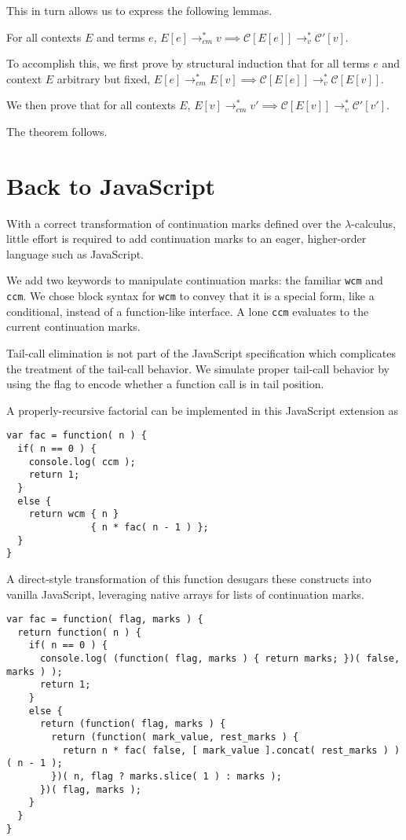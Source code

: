 \documentclass{llncs}
\newcommand{\lc}[0]{$\lambda$-calculus}
\newcommand{\lvrrs}[0]{\rightarrow_v^{*}}
\newcommand{\cmrrs}[0]{\rightarrow_{cm}^{*}}
\newcommand{\C}[1]{\mathcal{C}[#1]}
\newcommand{\Cp}[1]{\mathcal{C}'[#1]}
\begin{document}
This in turn allows us to express the following lemmas.

\begin{lemma}
For all contexts $E$ and terms $e$, $E[e]\cmrrs v\implies\C{E[e]}\lvrrs\Cp{v}$.
\end{lemma}

To accomplish this, we first prove by structural induction that for all terms $e$ and context $E$ arbitrary but fixed, $E[e]\cmrrs E[v]\implies\C{E[e]}\lvrrs\C{E[v]}$. 

We then prove that for all contexts $E$, $E[v]\cmrrs v'\implies\C{E[v]}\lvrrs\Cp{v'}$.

The theorem follows.

\section{Back to JavaScript}
\label{sec-javascript}

With a correct transformation of continuation marks defined over the \lc, little effort is required to add continuation marks to an eager, higher-order language such as JavaScript.

We add two keywords to manipulate continuation marks: the familiar \texttt{wcm} and \texttt{ccm}. We chose block syntax for \texttt{wcm} to convey that it is a special form, like a conditional, instead of a function-like interface. A lone \texttt{ccm} evaluates to the current continuation marks.

Tail-call elimination is not part of the JavaScript specification which complicates the treatment of the tail-call behavior. We simulate proper tail-call behavior by using the flag to encode whether a function call is in tail position.

A properly-recursive factorial can be implemented in this JavaScript extension as
\begin{verbatim}
var fac = function( n ) {
  if( n == 0 ) {
    console.log( ccm );
    return 1;
  }
  else {
    return wcm { n }
               { n * fac( n - 1 ) };
  }
}
\end{verbatim}

A direct-style transformation of this function desugars these constructs into vanilla JavaScript, leveraging native arrays for lists of continuation marks.
\begin{verbatim}
var fac = function( flag, marks ) {
  return function( n ) {
    if( n == 0 ) {
      console.log( (function( flag, marks ) { return marks; })( false, marks ) );
      return 1;
    }
    else {
      return (function( flag, marks ) {
        return (function( mark_value, rest_marks ) {
          return n * fac( false, [ mark_value ].concat( rest_marks ) )( n - 1 );
        })( n, flag ? marks.slice( 1 ) : marks );
      })( flag, marks );
    }
  }
}
\end{verbatim}
\end{document}
